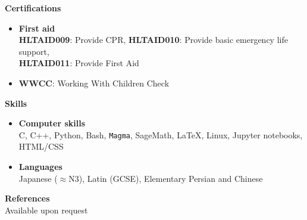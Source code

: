 \documentclass{article}
\newcommand\cvsec[2]{
	\LARGE{\textbf{#1}}\hspace{2.5pt}\hrulefill\\
	\large{#2}
}
\newcommand\cvcert[2]{\textbf{#1}: #2}
\begin{document}
	\cvsec{Certifications}{
		\begin{itemize}
			\item \textbf{First aid}\\
			\cvcert{HLTAID009}{Provide CPR},
			\cvcert{HLTAID010}{Provide basic emergency life support},\\
			\cvcert{HLTAID011}{Provide First Aid}
			\item \cvcert{WWCC}{Working With Children Check}
		\end{itemize}
	}
	\cvsec{Skills}{
		\begin{itemize}
			\item \textbf{Computer skills}\\
			C, C++, Python, Bash, \texttt{Magma}, SageMath, \LaTeX, Linux, Jupyter notebooks, HTML/CSS\\
			\item\textbf{Languages}\\
			Japanese ($\approx$N3), Latin (GCSE), Elementary Persian and Chinese
		\end{itemize}
	}
	\cvsec{References}{Available upon request
	}
\end{document}
